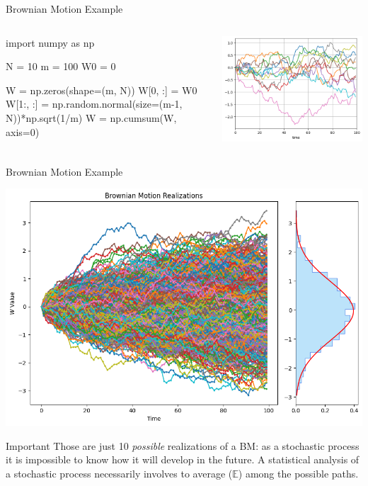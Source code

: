 \documentclass{beamer}
\begin{document}
\begin{frame}[fragile]{Brownian Motion Example}
\begin{columns}
\begin{ipython}
import numpy as np

N = 10
m = 100
W0 = 0

W = np.zeros(shape=(m, N))
W[0, :] = W0
W[1:, :] = np.random.normal(size=(m-1, N))*np.sqrt(1/m)
W = np.cumsum(W, axis=0)
\end{ipython}
\begin{center}    
    \includegraphics[width=1.\linewidth]{images/bm_realizations}
\end{center}
\end{columns}
\end{frame}

\begin{frame}[fragile]{Brownian Motion Example}
	\begin{center}    
		\includegraphics[width=0.5\linewidth]{images/bm_realizations_density}
	\end{center}
	\begin{block}{Important}
		Those are just 10 \emph{possible} realizations of a  BM: as a stochastic process it is impossible to know how it will develop in the future. A statistical analysis of a stochastic process necessarily involves to average ($\mathbb{E}$) among the possible paths.
	\end{block}
\end{frame}
\end{document}
